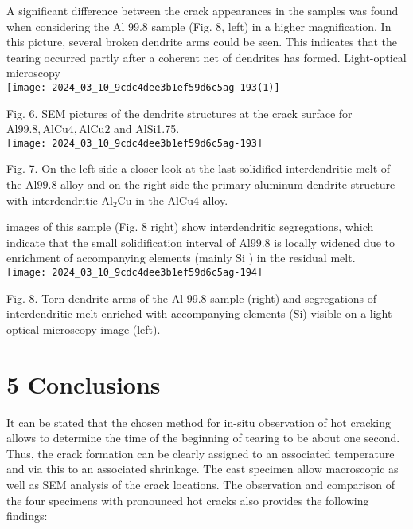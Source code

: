 \documentclass[10pt]{article}
\begin{document}
A significant difference between the crack appearances in the samples was found when considering the Al 99.8 sample (Fig. 8, left) in a higher magnification. In this picture, several broken dendrite arms could be seen. This indicates that the tearing occurred partly after a coherent net of dendrites has formed. Light-optical microscopy\\
\texttt{[image: 2024\_03\_10\_9cdc4dee3b1ef59d6c5ag-193(1)]}

Fig. 6. SEM pictures of the dendrite structures at the crack surface for $\mathrm{Al} 99.8, \mathrm{AlCu} 4, \mathrm{AlCu} 2$ and AlSi1.75.\\
\texttt{[image: 2024\_03\_10\_9cdc4dee3b1ef59d6c5ag-193]}

Fig. 7. On the left side a closer look at the last solidified interdendritic melt of the $\mathrm{Al} 99.8$ alloy and on the right side the primary aluminum dendrite structure with interdendritic $\mathrm{Al}_{2} \mathrm{Cu}$ in the $\mathrm{AlCu} 4$ alloy.

images of this sample (Fig. 8 right) show interdendritic segregations, which indicate that the small solidification interval of $\mathrm{Al} 99.8$ is locally widened due to enrichment of accompanying elements (mainly $\mathrm{Si}$ ) in the residual melt.\\
\texttt{[image: 2024\_03\_10\_9cdc4dee3b1ef59d6c5ag-194]}

Fig. 8. Torn dendrite arms of the Al 99.8 sample (right) and segregations of interdendritic melt enriched with accompanying elements (Si) visible on a light-optical-microscopy image (left).

\section*{5 Conclusions}
It can be stated that the chosen method for in-situ observation of hot cracking allows to determine the time of the beginning of tearing to be about one second. Thus, the crack formation can be clearly assigned to an associated temperature and via this to an associated shrinkage. The cast specimen allow macroscopic as well as SEM analysis of the crack locations. The observation and comparison of the four specimens with pronounced hot cracks also provides the following findings:
\end{document}
